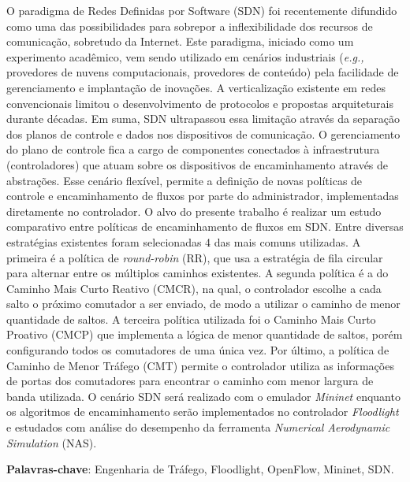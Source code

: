 
\setlength{\absparsep}{18pt} %
\begin{resumo}
O paradigma de Redes Definidas por Software (SDN) foi recentemente difundido como uma das possibilidades para sobrepor a inflexibilidade dos recursos de comunicação, sobretudo da Internet.
Este paradigma, iniciado como um experimento acadêmico, vem sendo utilizado em cenários industriais (\textit{e.g.,} provedores de nuvens computacionais, provedores de conteúdo) pela facilidade de gerenciamento e implantação de inovações. 
A verticalização existente em redes convencionais limitou o desenvolvimento de protocolos e propostas arquiteturais durante décadas.
Em suma, SDN ultrapassou essa limitação através da separação dos planos de controle e dados nos dispositivos de comunicação.
O gerenciamento do plano de controle fica a cargo de componentes conectados à infraestrutura (controladores) que atuam sobre os dispositivos de encaminhamento através de abstrações.
Esse cenário flexível, permite a definição de novas políticas de controle e encaminhamento de fluxos por parte do administrador, implementadas diretamente no controlador. 
O alvo do presente trabalho é realizar um estudo comparativo entre políticas de encaminhamento de fluxos em SDN. Entre diversas estratégias existentes foram selecionadas 4 das mais comuns utilizadas. A primeira é a política de \textit{round-robin} (RR), que usa a estratégia de fila circular para alternar entre os múltiplos caminhos existentes. A segunda política é a do Caminho Mais Curto Reativo (CMCR), na qual, o controlador escolhe a cada salto o próximo comutador a ser enviado, de modo a utilizar o caminho de menor quantidade de saltos. A terceira política utilizada foi o Caminho Mais Curto Proativo  (CMCP) que implementa a lógica de menor quantidade de saltos, porém configurando todos os comutadores de uma única vez. Por último, a política de Caminho de Menor Tráfego (CMT) permite o controlador utiliza as informações de portas dos comutadores para encontrar o caminho com menor largura de banda utilizada. O cenário SDN será realizado com o emulador \textit{Mininet} enquanto os algoritmos de encaminhamento serão implementados no controlador \textit{Floodlight} e estudados com análise do desempenho da ferramenta \textit{Numerical Aerodynamic Simulation} (NAS).

 \textbf{Palavras-chave}: Engenharia de Tráfego, Floodlight, OpenFlow, Mininet, SDN.
\end{resumo}
